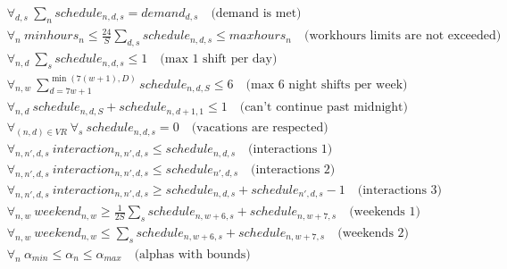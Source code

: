 \documentclass{article}
\begin{document}
\begin{align*}
&\forall_{d,s}\ \sum_n schedule_{n,d,s} = demand_{d, s}\quad \text{(demand is met)} \\
&\forall_{n}\ minhours_n \leq \frac{24}S \sum_{d, s} schedule_{n,d,s} \leq maxhours_n \quad \text{(workhours limits are not exceeded)} \\
&\forall_{n,d}\ \sum_s schedule_{n,d,s} \leq 1\quad \text{(max 1 shift per day)} \\
&\forall_{n,w}\ \sum_{d=7w+1}^{\min(7(w+1), D)} schedule_{n,d,S} \leq 6\quad \text{(max 6 night shifts per week)} \\
&\forall_{n,d}\ schedule_{n,d,S}+schedule_{n,d+1,1} \leq 1\quad \text{(can't continue past midnight)} \\
&\forall_{(n,d)\in VR}\ \forall_s\ schedule_{n,d,s} = 0\quad \text{(vacations are respected)} \\
&\forall_{n,n',d,s}\ interaction_{n,n',d,s} \leq schedule_{n,d,s}\quad \text{(interactions 1)} \\
&\forall_{n,n',d,s}\ interaction_{n,n',d,s} \leq schedule_{n',d,s}\quad \text{(interactions 2)} \\
&\forall_{n,n',d,s}\ interaction_{n,n',d,s} \geq schedule_{n,d,s}+schedule_{n',d,s}-1\quad \text{(interactions 3)} \\
&\forall_{n, w}\ weekend_{n, w} \geq \frac{1}{2S}\sum_s schedule_{n, w+6, s} + schedule_{n, w+7, s} \quad \text{(weekends 1)} \\
&\forall_{n, w}\ weekend_{n, w} \leq \sum_s schedule_{n, w+6, s} + schedule_{n, w+7, s} \quad \text{(weekends 2)} \\
&\forall_{n}\ \alpha_{min} \leq \alpha_n \leq \alpha_{max}\quad \text{(alphas with bounds)}
\end{align*}
\end{document}

